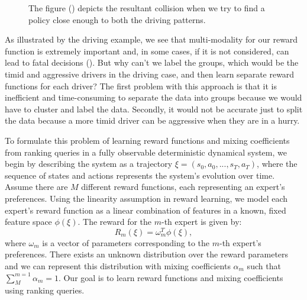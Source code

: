 \documentclass[
  letterpaper,
  numbers=noenddot,
  DIV=11]{scrreprt}
\theoremstyle{definition}
\theoremstyle{plain}
\theoremstyle{plain}
\theoremstyle{remark}
\begin{document}
\begin{figure}


\caption{\label{fig-driving-coll}The figure
() depicts the
resultant collision when we try to find a policy close enough to both
the driving patterns.}

\end{figure}%

As illustrated by the driving example, we see that multi-modality for
our reward function is extremely important and, in some cases, if it is
not considered, can lead to fatal decisions
(). But why can't we
label the groups, which would be the timid and aggressive drivers in the
driving case, and then learn separate reward functions for each driver?
The first problem with this approach is that it is inefficient and
time-consuming to separate the data into groups because we would have to
cluster and label the data. Secondly, it would not be accurate just to
split the data because a more timid driver can be aggressive when they
are in a hurry.

To formulate this problem of learning reward functions and mixing
coefficients from ranking queries in a fully observable deterministic
dynamical system, we begin by describing the system as a trajectory
\(\xi = (s_0, a_0, ..., s_T, a_T)\), where the sequence of states and
actions represents the system's evolution over time. Assume there are
\(M\) different reward functions, each representing an expert's
preferences. Using the linearity assumption in reward learning, we model
each expert's reward function as a linear combination of features in a
known, fixed feature space \(\phi(\xi)\). The reward for the \(m\)-th
expert is given by: \[R_m(\xi) = \omega^T_m \phi(\xi),\] where
\(\omega_m\) is a vector of parameters corresponding to the \(m\)-th
expert's preferences. There exists an unknown distribution over the
reward parameters and we can represent this distribution with mixing
coefficients \(\alpha_m\) such that \(\sum_M^{m = 1} \alpha_m = 1\). Our
goal is to learn reward functions and mixing coefficients using ranking
queries.
\end{document}

